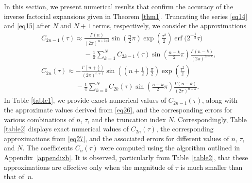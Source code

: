 \documentclass[pdftex]{sigma}
\def\erf{\operatorname{erf}}
\numberwithin{equation}{section}
\begin{document}
In this section, we present numerical results that confirm the accuracy of the inverse factorial expansions given in Theorem \ref{thm1}. Truncating the series \eqref{eq14} and \eqref{eq15} after $N$ and $N+1$ terms, respectively, we consider the approximations
\begin{align}
& C_{2n - 1} (\tau ) \approx \frac{\Gamma (n)}{(2\pi )^{n + 1/2}}\sin \left( \frac{n }{2}\pi \right)\exp \left( \frac{\tau ^2 }{2} \right)\erf\big( 2^{ - \frac{1}{2}} \tau \big) \nonumber \\&\phantom{ C_{2n - 1} (\tau ) \approx}{} - \frac{1}{\pi }\sum_{k = 1}^N C_{2k - 1} (\tau )\sin \left( \frac{n - k}{2}\pi \right)\frac{\Gamma (n - k)}{(2\pi )^{n - k} } ,\label{eq26}
\\ &
C_{2n} (\tau ) \approx - \frac{\Gamma \left( n + \frac{1}{2} \right)}{(2\pi )^{n + 1} }\sin \left( \left( n + \frac{1}{2} \right)\frac{\pi }{2} \right)\exp \left( \frac{\tau ^2}{2} \right)\nonumber\\
&\phantom{C_{2n} (\tau ) \approx}{} - \frac{1}{\pi }\sum\limits_{k = 0}^N C_{2k} (\tau )\sin \left( \frac{n - k}{2}\pi \right)\frac{\Gamma (n - k)}{(2\pi )^{n - k} }.\label{eq27}
\end{align}
In Table \ref{table1}, we provide exact numerical values of $C_{2n-1}(\tau)$, along with the approximate values derived from \eqref{eq26}, and the corresponding errors for various combinations of $n$, $\tau$, and the truncation index $N$. Correspondingly, Table \ref{table2} displays exact numerical values of $C_{2n}(\tau)$, the corresponding approximations from \eqref{eq27}, and the associated errors for different values of $n$, $\tau$, and $N$. The coefficients $C_n(\tau)$ were computed using the algorithm outlined in Appendix~\ref{appendixb}. It is observed, particularly from Table~\ref{table2}, that these approximations are effective only when the magnitude of $\tau$ is much smaller than that of~$n$.
\end{document}
